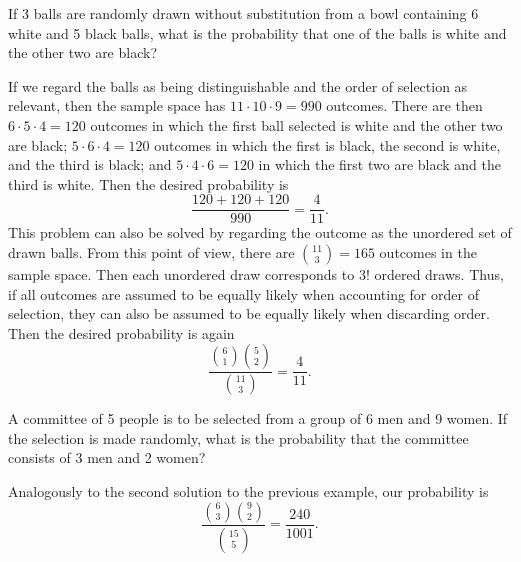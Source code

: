 \begin{changebar}
\begin{example}
    If 3 balls are randomly drawn without substitution from a bowl containing 6 white and 5 black balls, what is the probability that one of the balls is white and the other two are black?
\end{example}
\begin{solution}
    If we regard the balls as being distinguishable and the order of selection as relevant, then the sample space has $11\cdot 10 \cdot 9 = 990$ outcomes. There are then $6 \cdot 5 \cdot 4 = 120$ outcomes in which the first ball selected is white and the other two are black; $5 \cdot 6 \cdot 4 = 120$ outcomes in which the first is black, the second is white, and the third is black; and $5 \cdot 4 \cdot 6 = 120$ in which the first two are black and the third is white. Then the desired probability is \[
        \frac{120 + 120 + 120}{990} = \frac{4}{11}.    
    \]
    This problem can also be solved by regarding the outcome as the unordered set of drawn balls. From this point of view, there are $\binom{11}{3} = 165$ outcomes in the sample space. Then each unordered draw corresponds to $3!$ ordered draws. Thus, if all outcomes are assumed to be equally likely when accounting for order of selection, they can also be assumed to be equally likely when discarding order. Then the desired probability is again \[
        \frac{\binom{6}{1}\binom{5}{2}}{\binom{11}{3}} = \frac{4}{11}.    
    \]
\end{solution}
\end{changebar}

\begin{changebar}
\begin{example}
    A committee of 5 people is to be selected from a group of 6 men and 9 women. If the selection is made randomly, what is the probability that the committee consists of 3 men and 2 women?
\end{example}
\begin{solution}
    Analogously to the second solution to the previous example, our probability is \[
        \dfrac{\binom{6}{3}\binom{9}{2}}{\binom{15}{5}} = \frac{240}{1001}.
    \]
\end{solution}
\end{changebar}

